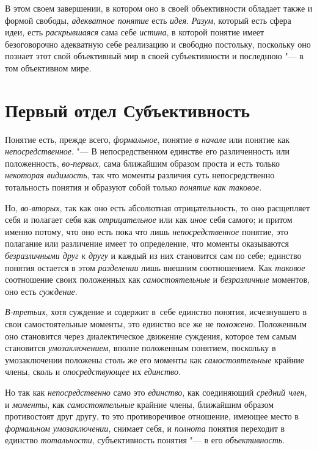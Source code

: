 В этом своем завершении, в котором оно в своей объективности
обладает также и формой свободы, {\em адекватное понятие} есть
{\em идея}. {\em Разум}, который есть сфера идеи, есть {\em раскрывшаяся}
сама себе {\em истина}, в которой понятие имеет безоговорочно адекватную себе
реализацию и свободно постольку, поскольку оно познает этот свой
объективный мир в своей субъективности и последнюю "--- в том объективном мире.

\clearpage\part[Первый отдел\newline СУБЪЕКТИВНОСТЬ]{Первый отдел Субъективность}
Понятие есть, прежде всего, {\em формальное}, понятие {\em в начале} или
понятие как {\em непосредственное}. "---
В непосредственном единстве его различенность или
положенность, {\em во-первых}, сама ближайшим образом проста и есть только
{\em некоторая видимость}, так что моменты различия суть непосредственно
тотальность понятия и образуют собой только {\em понятие как таковое}.

Но, {\em во-вторых}, так как оно есть абсолютная отрицательность, то оно
расщепляет себя и полагает себя как {\em отрицательное} или
как {\em иное} себя самого; и притом именно потому, что оно есть пока что лишь
{\em непосредственное} понятие, это полагание или различение имеет то
определение, что моменты оказываются {\em безразличными друг к другу}
и каждый из них становится сам по себе; единство понятия
остается в этом {\em разделении} лишь внешним соотношением. Как
{\em таковое} соотношение своих положенных как {\em самостоятельные} и
{\em безразличные} моментов, оно есть {\em суждение}.

{\em В-третьих}, хотя
суждение и содержит в~себе единство понятия, исчезнувшего в свои
самостоятельные моменты, это единство все же не {\em положено}.
Положенным оно становится через диалектическое движение
суждения, которое тем самым становится {\em умозаключением},
вполне положенным понятием, поскольку в умозаключении
положены столь же его моменты как {\em самостоятельные}
крайние члены, сколь и {\em опосредствующее} их {\em единство}.

Но так как {\em непосредственно} само это {\em единство}, как соединяющий
{\em средний член}, и {\em моменты}, как {\em самостоятельные}
крайние члены, ближайшим образом противостоят друг другу, то
это противоречивое отношение, имеющее место в
{\em формальном умозаключении}, снимает себя, и {\em полнота} понятия
переходит в единство {\em тотальности},
субъективность понятия "--- в его {\em объективность}.

